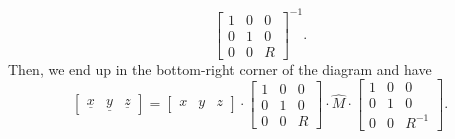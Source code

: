 \documentclass[newpage,hints,handout,noauthor,nooutcomes,12pt]{ximera}
\begin{document}
\begin{problem}
\begin{freeResponse}
\[\begin{bmatrix}
1 & 0 & 0\\
0 & 1 & 0\\
0 & 0 & R
\end{bmatrix}^{-1}.
\]
Then, we end up in the bottom-right corner of the diagram and have
\[
\begin{bmatrix}
\underline{x} & \underline{y} & \underline{z}%
\end{bmatrix}
=\begin{bmatrix}
x & y & z
\end{bmatrix}
  \cdot \begin{bmatrix}
%
1 & 0 & 0\\
0 & 1 & 0\\
0 & 0 & R
\end{bmatrix}
  \cdot\hat{M}\cdot\begin{bmatrix}
%
1 & 0 & 0\\
0 & 1 & 0\\
0 & 0 & R^{-1}
\end{bmatrix}.
\]

\end{freeResponse}
\end{problem}

\end{document}
